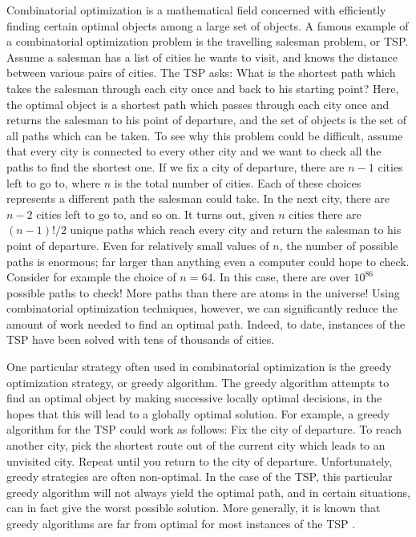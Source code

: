 \documentclass[a4paper,11pt]{report}
\theoremstyle{plain}
\theoremstyle{definition}
\begin{document}
Combinatorial optimization is a mathematical field concerned with efficiently
finding certain optimal objects among a large set of objects. A famous example
of a combinatorial optimization problem is the travelling salesman problem, or
TSP\@. Assume a salesman has a list of cities he wants to visit, and knows the
distance between various pairs of cities. The TSP asks: What is the shortest
path which takes the salesman through each city once and back to his starting
point? Here, the optimal object is a shortest path which passes through each
city once and returns the salesman to his point of departure, and the set of
objects is the set of all paths which can be taken.  To see why this problem
could be difficult, assume that every city is connected to every other city and
we want to check all the paths to find the shortest one. If we fix a city of
departure, there are $n-1$ cities left to go to, where $n$ is the total number
of cities.  Each of these choices represents a different path the salesman
could take. In the next city, there are $n-2$ cities left to go to, and so on.
It turns out, given $n$ cities there are $(n-1)!/2$ unique paths which reach
every city and return the salesman to his point of departure. Even for
relatively small values of $n$, the number of possible paths is enormous; far
larger than anything even a computer could hope to check. Consider for example
the choice of $n = 64$. In this case, there are over $10^{86}$ possible paths
to check! More paths than there are atoms in the universe! Using combinatorial
optimization techniques, however, we can significantly reduce the amount of
work needed to find an optimal path.  Indeed, to date, instances of the TSP
have been solved with tens of thousands of cities.

One particular strategy often used in combinatorial optimization is the greedy
optimization strategy, or greedy algorithm. The greedy algorithm attempts to
find an optimal object by making successive locally optimal decisions, in the
hopes that this will lead to a globally optimal solution. For example, a greedy
algorithm for the TSP could work as follows: Fix the city of departure.  To
reach another city, pick the shortest route out of the current city which leads
to an unvisited city. Repeat until you return to the city of departure.
Unfortunately, greedy strategies are often non-optimal. In the case of the TSP,
this particular greedy algorithm will not always yield the optimal path, and in
certain situations, can in fact give the worst possible solution. More
generally, it is known that greedy algorithms are far from optimal for most
instances of the TSP \cite{greedy-tsp}.
\end{document}
